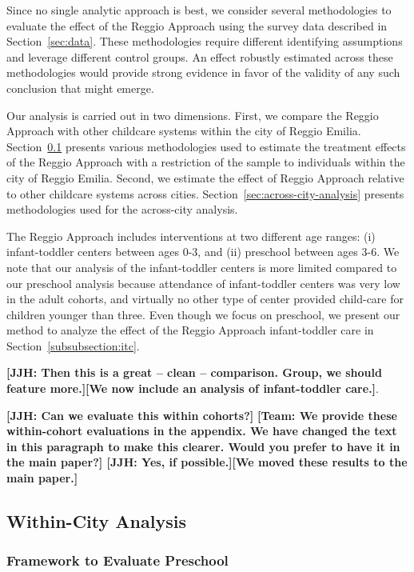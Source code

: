 Since no single analytic approach is best, we consider several methodologies to evaluate the effect of the Reggio Approach using the survey data described in Section~\ref{sec:data}. These methodologies require different identifying assumptions and leverage different control groups. An effect robustly estimated across these methodologies would provide strong evidence in favor of the validity of any such conclusion that might emerge.

Our analysis is carried out in two dimensions. First, we compare the Reggio Approach with other childcare systems within the city of Reggio Emilia. Section~\ref{sec:within-city-analysis} presents various methodologies used to estimate the treatment effects of the Reggio Approach with a restriction of the sample to individuals within the city of Reggio Emilia. Second, we estimate the effect of Reggio Approach relative to other childcare systems across cities. Section~\ref{sec:across-city-analysis} presents methodologies used for the across-city analysis.

The Reggio Approach includes interventions at two different age ranges: (i) infant-toddler centers between ages 0-3, and (ii) preschool between ages 3-6. We note that our analysis of the infant-toddler centers is more limited compared to our preschool analysis because attendance of infant-toddler centers was very low in the adult cohorts, and virtually no other type of center provided child-care for children younger than three. Even though we focus on preschool, we present our method to analyze the effect of the Reggio Approach infant-toddler care in Section~\ref{subsubsection:itc}.

\textbf{[JJH: Then this is a great -- clean -- comparison. Group, we should feature more.][We now include an analysis of infant-toddler care.]}. 

\textbf{[JJH: Can we evaluate this within cohorts?]} \textbf{[Team: We provide these within-cohort evaluations in the appendix. We have changed the text in this paragraph to make this clearer. Would you prefer to have it in the main paper?] [JJH: Yes, if possible.][We moved these results to the main paper.]}

\subsection{Within-City Analysis} \label{sec:within-city-analysis}

\subsubsection{Framework to Evaluate Preschool} 
\label{subsubsection:OLS-Preschool}

